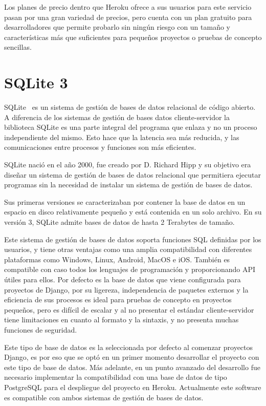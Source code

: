 \documentclass[a4paper, 12pt]{book}
\begin{document}
Los planes de precio dentro que Heroku ofrece a sus usuarios para este servicio pasan por una gran variedad de precios, pero cuenta con un plan gratuito para desarrolladores que permite probarlo sin ningún riesgo con un tamaño y características más que suficientes para pequeños proyectos o pruebas de concepto sencillas. 

\section{SQLite 3}
\label{sec:SQLite}

SQLite~\cite{sqlite} es un sistema de gestión de bases de datos relacional de código abierto.  A diferencia de los sistemas de gestión de bases datos cliente-servidor la biblioteca SQLite es una parte integral del programa que enlaza y no un proceso independiente del mismo. Esto hace que la latencia sea más reducida, y las comunicaciones entre procesos y funciones son más eficientes. 

SQLite nació en el año 2000, fue creado por D. Richard Hipp y su objetivo era diseñar un sistema de gestión de bases de datos relacional que permitiera ejecutar programas sin la necesidad de instalar un sistema de gestión de bases de datos. 

Sus primeras versiones se caracterizaban por contener la base de datos en un espacio en disco relativamente pequeño y está contenida en un solo archivo. En su versión 3, SQLite admite bases de datos de hasta 2 Terabytes de tamaño. 

Este sistema de gestión de bases de datos soporta funciones SQL definidas por los usuarios, y tiene otras ventajas como una amplia compatibilidad con diferentes plataformas como Windows, Linux, Android, MacOS e iOS. También es compatible con caso todos los lenguajes de programación y proporcionando API útiles para ellos. Por defecto es la base de datos que viene configurada para proyectos de Django, por su ligereza, independencia de paquetes externos y la eficiencia de sus procesos es ideal para pruebas de concepto en proyectos pequeños, pero es difícil de escalar y al no presentar el estándar cliente-servidor tiene limitaciones en cuanto al formato y la sintaxis, y no presenta muchas funciones de seguridad.

Este tipo de base de datos es la seleccionada por defecto al comenzar proyectos Django, es por eso que se optó en un primer momento desarrollar el proyecto con este tipo de base de datos. Más adelante, en un punto avanzado del desarrollo fue necesario implementar la compatibilidad con una base de datos de tipo PostgreSQL para el despliegue del proyecto en Heroku. Actualmente este software es compatible con ambos sistemas de gestión de bases de datos.
\end{document}
